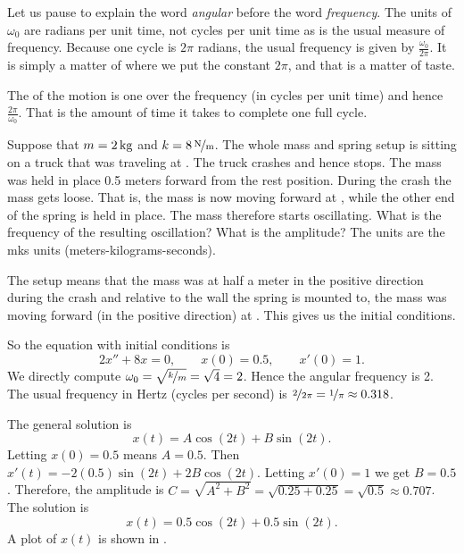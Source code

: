 Let us pause to explain the word \emph{angular}
before the word \emph{frequency}.
The units of
$\omega_0$ are radians per unit time, not cycles per unit time 
as is the usual measure of frequency.  Because one cycle is $2
\pi$ radians, the usual frequency is given by $\frac{\omega_0}{2\pi}$.
It is simply a matter of where we put the constant $2\pi$, and that is a
matter of taste.

The \emph{} of the motion is one over the frequency (in cycles per unit
time) and hence $\frac{2\pi}{\omega_0}$.  That is the amount of time it takes
to complete one full cycle.


\begin{example}
Suppose that $m=\unit[2]{kg}$ and $k=\unitfrac[8]{N}{m}$.
The whole mass and spring setup is sitting on
a truck that was traveling at .
The truck crashes and hence stops.
The mass was held in place 0.5 meters forward from the rest position.  During
the crash the mass gets loose.  That is, the mass is now 
moving forward at , while the other end of the
spring is held
in place.  The mass therefore starts oscillating.
What is the frequency of the resulting oscillation?  What is the amplitude?
The units are the mks units (meters-kilograms-seconds).

The setup means that the mass was at half a meter in the positive
direction during the crash and
relative to the wall the spring is mounted to, the mass was moving forward
(in the positive direction) at .  This gives us the initial
conditions.

So the equation with initial conditions is
\begin{equation*}
2 x'' + 8 x = 0 , \qquad x(0) = 0.5, \qquad x'(0) = 1.
\end{equation*}
We directly compute $\omega_0 = \sqrt{\nicefrac{k}{m}} = \sqrt{4} = 2$.
Hence the angular frequency is 2.  The usual frequency in Hertz (cycles per
second) is $\nicefrac{2}{2\pi} = \nicefrac{1}{\pi} \approx 0.318$.

The general solution is
\begin{equation*}
x(t) = A \cos (2t) + B \sin (2t) .
\end{equation*}
Letting $x(0) = 0.5$ means $A = 0.5$.  Then $x'(t) = - 2(0.5) \sin (2t)
+ 2B \cos (2t)$.
Letting $x'(0) = 1$ we get $B = 0.5$.  Therefore, the amplitude is
$C = \sqrt{A^2+B^2} = \sqrt{0.25+0.25} = \sqrt{0.5} \approx 0.707$.  The solution is
\begin{equation*}
x(t) = 0.5 \cos (2t) + 0.5 \sin (2t) .
\end{equation*}
A plot of $x(t)$ is shown in .
\end{example}

